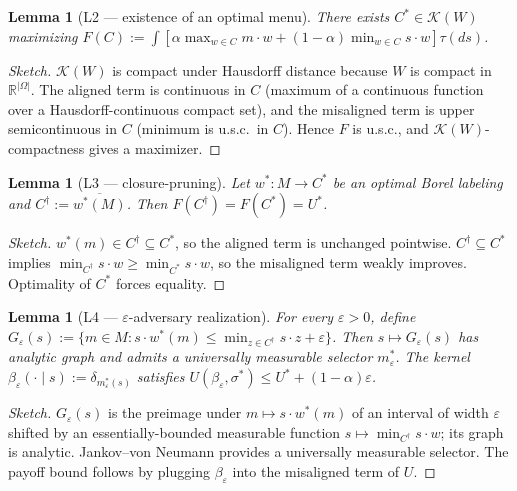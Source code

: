 \documentclass[11pt]{article}
\newtheorem{lemma}[theorem]{Lemma}
\theoremstyle{definition}
\theoremstyle{remark}
\newcommand{\R}{\mathbb{R}}
\newcommand{\eps}{\varepsilon}
\newcommand{\Om}{\Omega}
\begin{document}
\begin{lemma}[L2 --- existence of an optimal menu]\label{lem:menu-exist}
There exists $C^*\in\mathcal K(W)$ maximizing
$F(C) := \int[\alpha\max_{w\in C}m\cdot w + (1-\alpha)\min_{w\in C}s\cdot w]\tau(ds)$.
\end{lemma}

\begin{proof}[Sketch]
$\mathcal K(W)$ is compact under Hausdorff distance because $W$ is
compact in $\R^{|\Om|}$. The aligned term is continuous in $C$
(maximum of a continuous function over a Hausdorff-continuous compact
set), and the misaligned term is upper semicontinuous in $C$
(minimum is u.s.c.\ in $C$). Hence $F$ is u.s.c., and
$\mathcal K(W)$-compactness gives a maximizer.
\end{proof}

\begin{lemma}[L3 --- closure-pruning]\label{lem:pruning}
Let $w^*:M\to C^*$ be an optimal Borel labeling and
$C^\dagger := \overline{w^*(M)}$. Then $F(C^\dagger) = F(C^*) = U^*$.
\end{lemma}

\begin{proof}[Sketch]
$w^*(m)\in C^\dagger\subseteq C^*$, so the aligned term is unchanged
pointwise. $C^\dagger\subseteq C^*$ implies
$\min_{C^\dagger}s\cdot w \ge \min_{C^*}s\cdot w$, so the misaligned
term weakly improves. Optimality of $C^*$ forces equality.
\end{proof}

\begin{lemma}[L4 --- $\eps$-adversary realization]\label{lem:eps-adv}
For every $\eps>0$, define
$G_\eps(s) := \{m\in M : s\cdot w^*(m)\le \min_{z\in C^\dagger}s\cdot z + \eps\}$.
Then $s\mapsto G_\eps(s)$ has analytic graph and admits a universally
measurable selector $m_\eps^*$. The kernel
$\beta_\eps(\cdot\mid s) := \delta_{m_\eps^*(s)}$ satisfies
$U(\beta_\eps,\sigma^*) \le U^* + (1-\alpha)\eps$.
\end{lemma}

\begin{proof}[Sketch]
$G_\eps(s)$ is the preimage under $m\mapsto s\cdot w^*(m)$ of an
interval of width $\eps$ shifted by an essentially-bounded measurable
function $s\mapsto\min_{C^\dagger}s\cdot w$; its graph is analytic.
Jankov--von Neumann \cite[Thm.~18.13]{AliprantisBorder2006} provides
a universally measurable selector. The payoff bound follows by
plugging $\beta_\eps$ into the misaligned term of $U$.
\end{proof}
\end{document}
